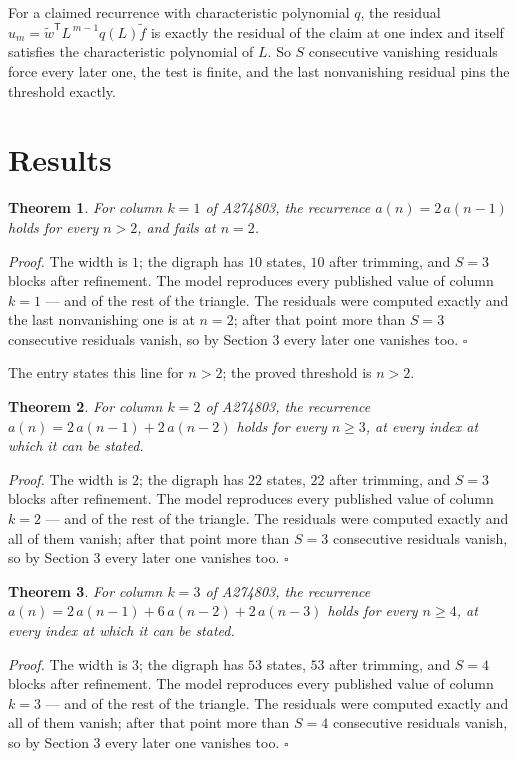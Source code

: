 \documentclass[11pt]{article}
\newtheorem{theorem}{Theorem}
\theoremstyle{definition}
\begin{document}
For a claimed recurrence with characteristic polynomial $q$, the residual $u_m = \tilde w^{\mathsf T}L^{\,m-1}q(L)\tilde f$ is exactly the residual of the claim at one index and itself satisfies the characteristic polynomial of $L$. So $S$ consecutive vanishing residuals force every later one, the test is finite, and the last nonvanishing residual pins the threshold exactly.

\section{Results}

\begin{theorem} For column $k = 1$ of A274803, the recurrence $a(n) = 2\,a(n-1)$ holds for every $n > 2$, and fails at $n = 2$.\end{theorem}

{\itshape Proof.} The width is $1$; the digraph has $10$ states, $10$ after trimming, and $S = 3$ blocks after refinement. The model reproduces every published value of column $k = 1$ --- and of the rest of the triangle. The residuals were computed exactly and the last nonvanishing one is at $n = 2$; after that point more than $S = 3$ consecutive residuals vanish, so by Section 3 every later one vanishes too. $\square$

The entry states this line for $n > 2$; the proved threshold is $n > 2$.

\begin{theorem} For column $k = 2$ of A274803, the recurrence $a(n) = 2\,a(n-1) + 2\,a(n-2)$ holds for every $n \ge 3$, at every index at which it can be stated.\end{theorem}

{\itshape Proof.} The width is $2$; the digraph has $22$ states, $22$ after trimming, and $S = 3$ blocks after refinement. The model reproduces every published value of column $k = 2$ --- and of the rest of the triangle. The residuals were computed exactly and all of them vanish; after that point more than $S = 3$ consecutive residuals vanish, so by Section 3 every later one vanishes too. $\square$

\begin{theorem} For column $k = 3$ of A274803, the recurrence $a(n) = 2\,a(n-1) + 6\,a(n-2) + 2\,a(n-3)$ holds for every $n \ge 4$, at every index at which it can be stated.\end{theorem}

{\itshape Proof.} The width is $3$; the digraph has $53$ states, $53$ after trimming, and $S = 4$ blocks after refinement. The model reproduces every published value of column $k = 3$ --- and of the rest of the triangle. The residuals were computed exactly and all of them vanish; after that point more than $S = 4$ consecutive residuals vanish, so by Section 3 every later one vanishes too. $\square$
\end{document}
